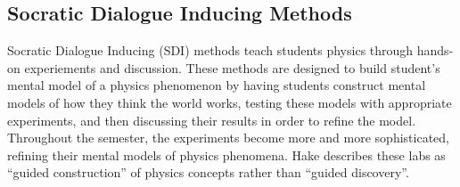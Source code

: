 %
%
%
%
%
%
%

\subsection{Socratic Dialogue Inducing Methods}

Socratic Dialogue Inducing (SDI) methods teach students physics through hands-on experiements and discussion. These methods are designed to build student's mental model of a physics phenomenon by having students construct mental models of how they think the world works, testing these models with appropriate experiments, and then discussing their results in order to refine the model. Throughout the semester, the experiments become more and more sophisticated, refining their mental models of physics phenomena. Hake describes these labs as ``guided construction'' of physics concepts rather than ``guided discovery''\cite{hake1992}.


